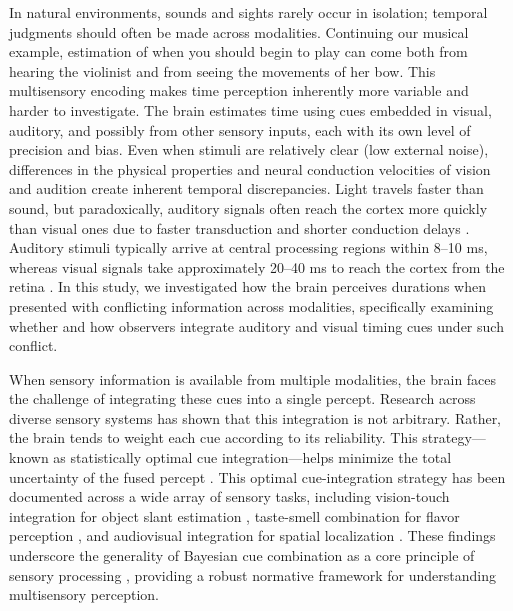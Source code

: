 \documentclass[9pt,lineno,doublespacing]{elife}
\begin{document}
In natural environments, sounds and sights rarely occur in isolation; temporal judgments should often be made across modalities. Continuing our musical example, estimation of when you should begin to play can come both from hearing the violinist and from seeing the movements of her bow. This multisensory encoding makes time perception inherently more variable and harder to investigate. The brain estimates time using cues embedded in visual, auditory, and possibly from other sensory inputs, each with its own level of precision and bias. Even when stimuli are relatively clear (low external noise), differences in the physical properties and neural conduction velocities of vision and audition create inherent temporal discrepancies. Light travels faster than sound, but paradoxically, auditory signals often reach the cortex more quickly than visual ones due to faster transduction and shorter conduction delays \citep{zoefel2017oscillatory}. Auditory stimuli typically arrive at central processing regions within 8--10 ms, whereas visual signals take approximately 20--40 ms to reach the cortex from the retina \citep{ king1985integration,vroomen2010perception}. In this study, we investigated how the brain perceives durations when presented with conflicting information across modalities, specifically examining whether and how observers integrate auditory and visual timing cues under such conflict.



When sensory information is available from multiple modalities, the brain faces the challenge of integrating these cues into a single percept. Research across diverse sensory systems has shown that this integration is not arbitrary. Rather, the brain tends to weight each cue according to its reliability. This strategy---known as statistically optimal cue integration---helps minimize the total uncertainty of the fused percept \citep{maloney1989statistical,young1993perturbation,landy1995measurement,ernst2002humans}. This optimal cue-integration strategy has been documented across a wide array of sensory tasks, including vision-touch integration for object slant estimation \citep{ernst2002humans,hillis2002combining}, taste-smell combination for flavor perception \citep{maier2020adaptive}, and audiovisual integration for spatial localization \citep{alais2004ventriloquist,negen2018bayes}. These findings underscore the generality of Bayesian cue combination as a core principle of sensory processing \citep{landy2001ideal,landy2011ideal,wolpert2011principles,alais2019cue,rossi2021mechanisms}, providing a robust normative framework for understanding multisensory perception.
\end{document}
